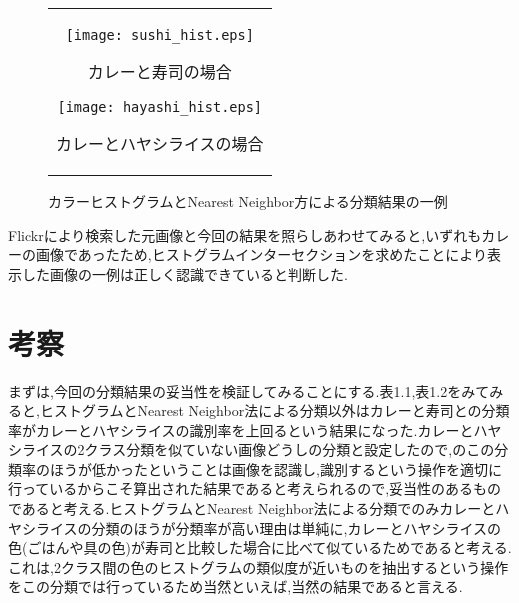 \documentclass[11pt,a4j]{jreport}
\begin{document}
\begin{figure}[htbp]
  \begin{center}
    \begin{tabular}{c}
      \begin{minipage}{0.5\hsize}
        \begin{center}
          \texttt{[image: sushi\_hist.eps]}
        \end{center}
        \hspace{2.2cm}カレーと寿司の場合
      \end{minipage}
      \begin{minipage}{0.5\hsize}
        \begin{center}
          \texttt{[image: hayashi\_hist.eps]}
        \end{center}
        \hspace{2.2cm}カレーとハヤシライスの場合
      \end{minipage}
    \end{tabular}
    \caption{カラーヒストグラムとNearest Neighbor方による分類結果の一例}
  \end{center}
\end{figure}
\newpage
Flickrにより検索した元画像と今回の結果を照らしあわせてみると,いずれもカレーの画像であったため,ヒストグラムインターセクションを求めたことにより表示した画像の一例は正しく認識できていると判断した.

\section{考察}

まずは,今回の分類結果の妥当性を検証してみることにする.表1.1,表1.2をみてみると,ヒストグラムとNearest Neighbor法による分類以外はカレーと寿司との分類率がカレーとハヤシライスの識別率を上回るという結果になった.カレーとハヤシライスの2クラス分類を似ていない画像どうしの分類と設定したので,のこの分類率のほうが低かったということは画像を認識し,識別するという操作を適切に行っているからこそ算出された結果であると考えられるので,妥当性のあるものであると考える.ヒストグラムとNearest Neighbor法による分類でのみカレーとハヤシライスの分類のほうが分類率が高い理由は単純に,カレーとハヤシライスの色(ごはんや具の色)が寿司と比較した場合に比べて似ているためであると考える.これは,2クラス間の色のヒストグラムの類似度が近いものを抽出するという操作をこの分類では行っているため当然といえば,当然の結果であると言える.\\
\end{document}
